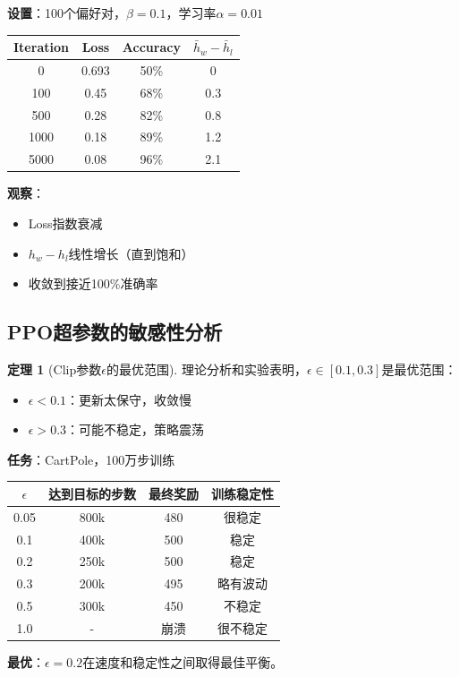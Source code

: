 \documentclass[11pt,a4paper]{article}
\theoremstyle{definition}
\newtheorem{theorem}{定理}[section]
\begin{document}
\begin{calculation}[DPO的收敛数值实验]
\textbf{设置}：100个偏好对，$\beta = 0.1$，学习率$\alpha = 0.01$

\begin{center}
\begin{tabular}{c|c|c|c}
\toprule
Iteration & Loss & Accuracy & $\bar{h}_w - \bar{h}_l$ \\
\midrule
0 & 0.693 & 50\% & 0 \\
100 & 0.45 & 68\% & 0.3 \\
500 & 0.28 & 82\% & 0.8 \\
1000 & 0.18 & 89\% & 1.2 \\
5000 & 0.08 & 96\% & 2.1 \\
\bottomrule
\end{tabular}
\end{center}

\textbf{观察}：
\begin{itemize}
    \item Loss指数衰减
    \item $h_w - h_l$线性增长（直到饱和）
    \item 收敛到接近100\%准确率
\end{itemize}
\end{calculation}

\subsection{PPO超参数的敏感性分析}

\begin{theorem}[Clip参数$\epsilon$的最优范围]
理论分析和实验表明，$\epsilon \in [0.1, 0.3]$是最优范围：
\begin{itemize}
    \item $\epsilon < 0.1$：更新太保守，收敛慢
    \item $\epsilon > 0.3$：可能不稳定，策略震荡
\end{itemize}
\end{theorem}

\begin{calculation}
\textbf{任务}：CartPole，100万步训练

\begin{center}
\begin{tabular}{c|c|c|c}
\toprule
$\epsilon$ & 达到目标的步数 & 最终奖励 & 训练稳定性 \\
\midrule
0.05 & 800k & 480 & 很稳定 \\
0.1 & 400k & 500 & 稳定 \\
0.2 & 250k & 500 & 稳定 \\
0.3 & 200k & 495 & 略有波动 \\
0.5 & 300k & 450 & 不稳定 \\
1.0 & - & 崩溃 & 很不稳定 \\
\bottomrule
\end{tabular}
\end{center}

\textbf{最优}：$\epsilon = 0.2$在速度和稳定性之间取得最佳平衡。
\end{calculation}
\end{document}

